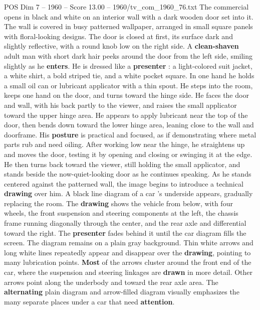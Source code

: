 \begin{textsample}{POS Dim 7 – 1960 – Score 13.00 – 1960/tv\_com\_1960\_76.txt}  \label{ex:f7_pos_024}
The commercial opens in black and white on an interior wall with a dark wooden door set into it.
The wall is covered in busy patterned wallpaper, arranged in small square panels with floral-looking designs.
The door is closed at first, its surface dark and slightly reflective, with a round knob low on the right side.
A \textbf{clean-shaven} adult man with short dark hair peeks around the door from the left side, smiling slightly as he \textbf{enters}.
He is dressed like a \textbf{presenter} : a light-colored suit jacket, a white shirt, a bold striped tie, and a white pocket square.
In one hand he holds a small oil can or lubricant applicator with a thin spout.
He steps into the room, keeps one hand on the door, and turns toward the hinge side.
He faces the door and wall, with his back partly to the viewer, and raises the small applicator toward the upper hinge area.
He appears to apply lubricant near the top of the door, then bends down toward the lower hinge area, leaning close to the wall and doorframe.
His \textbf{posture} is practical and focused, as if demonstrating where metal parts rub and need oiling.
After working low near the hinge, he straightens up and moves the door, testing it by opening and closing or swinging it at the edge.
He then turns back toward the viewer, still holding the small applicator, and stands beside the now-quiet-looking door as he continues speaking.
As he stands centered against the patterned wall, the image begins to introduce a technical \textbf{drawing} over him.
A black line diagram of a car ’s underside appears, gradually replacing the room.
The \textbf{drawing} shows the vehicle from below, with four wheels, the front suspension and steering components at the left, the chassis frame running diagonally through the center, and the rear axle and differential toward the right.
The \textbf{presenter} fades behind it until the car diagram fills the screen.
The diagram remains on a plain gray background.
Thin white arrows and long white lines repeatedly appear and disappear over the \textbf{drawing}, pointing to many lubrication points. \textbf{Most} of the arrows cluster around the front end of the car, where the suspension and steering linkages are \textbf{drawn} in more detail.
Other arrows point along the underbody and toward the rear axle area.
The \textbf{alternating} plain diagram and arrow-filled diagram visually emphasizes the many separate places under a car that need \textbf{attention}.

\end{textsample}
